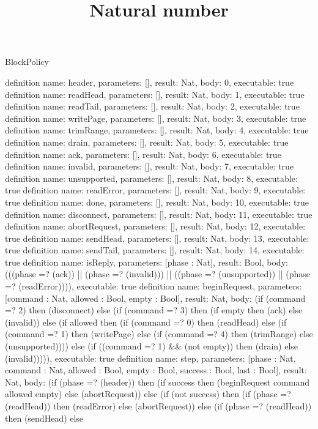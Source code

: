\begin{lexlean}{BlockPolicy}
\title{Natural number}
\begin{semanticmodule}
definition{ name: header, parameters: [], result: Nat, body: 0, executable: true }
definition{ name: readHead, parameters: [], result: Nat, body: 1, executable: true }
definition{ name: readTail, parameters: [], result: Nat, body: 2, executable: true }
definition{ name: writePage, parameters: [], result: Nat, body: 3, executable: true }
definition{ name: trimRange, parameters: [], result: Nat, body: 4, executable: true }
definition{ name: drain, parameters: [], result: Nat, body: 5, executable: true }
definition{ name: ack, parameters: [], result: Nat, body: 6, executable: true }
definition{ name: invalid, parameters: [], result: Nat, body: 7, executable: true }
definition{ name: unsupported, parameters: [], result: Nat, body: 8, executable: true }
definition{ name: readError, parameters: [], result: Nat, body: 9, executable: true }
definition{ name: done, parameters: [], result: Nat, body: 10, executable: true }
definition{ name: disconnect, parameters: [], result: Nat, body: 11, executable: true }
definition{ name: abortRequest, parameters: [], result: Nat, body: 12, executable: true }
definition{ name: sendHead, parameters: [], result: Nat, body: 13, executable: true }
definition{ name: sendTail, parameters: [], result: Nat, body: 14, executable: true }
definition{
  name: isReply, parameters: [phase : Nat], result: Bool,
  body: (((phase =? (ack)) || (phase =? (invalid))) || ((phase =? (unsupported)) || (phase =? (readError)))), executable: true
}
definition{
  name: beginRequest, parameters: [command : Nat, allowed : Bool, empty : Bool], result: Nat,
  body: (if (command =? 2) then (disconnect) else
    (if (command =? 3) then (if empty then (ack) else (invalid)) else
     (if allowed then
       (if (command =? 0) then (readHead) else (if (command =? 1) then (writePage) else
         (if (command =? 4) then (trimRange) else (unsupported))))
      else (if ((command =? 1) && (not empty)) then (drain) else (invalid))))), executable: true
}
definition{
  name: step, parameters: [phase : Nat, command : Nat, allowed : Bool, empty : Bool, success : Bool, last : Bool], result: Nat,
  body: (if (phase =? (header)) then (if success then (beginRequest command allowed empty) else (abortRequest)) else
    (if (not success) then (if (phase =? (readHead)) then (readError) else (abortRequest)) else
     (if (phase =? (readHead)) then (sendHead) else
}
\end{semanticmodule}
\end{lexlean}
